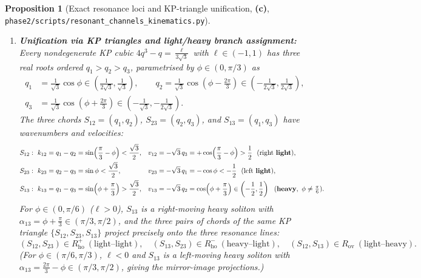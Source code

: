 \documentclass[11pt,a4paper]{article}
\newcommand{\Lc}{\textsf{\textbf{(c)}}\xspace}
\newcommand{\skin}{\texttt{phase2/\allowbreak scripts/\allowbreak resonant\_\allowbreak channels\_\allowbreak kinematics.py}}
\newtheorem{proposition}{Proposition}[section]
\theoremstyle{remark}
\begin{document}
\begin{proposition}[Exact resonance loci and KP-triangle unification, \Lc, \skin]
\begin{enumerate}
\item \textbf{Unification via KP triangles and light/heavy branch assignment:}
Every nondegenerate KP cubic $4q^3 - q = \frac{\ell}{3\sqrt{3}}$ with
$\ell \in (-1,1)$ has three real roots ordered $q_1 > q_2 > q_3$, parametrised
by $\phi \in (0,\pi/3)$ as
\begin{align}\label{eq:kp_triple_param}
  q_1 &= \frac{1}{\sqrt{3}}\cos\phi \in \left(\frac{1}{2\sqrt{3}},\frac{1}{\sqrt{3}}\right), \qquad
  q_2 = \frac{1}{\sqrt{3}}\cos\!\left(\phi-\frac{2\pi}{3}\right) \in \left(-\frac{1}{2\sqrt{3}},\frac{1}{2\sqrt{3}}\right), \nonumber\\
  q_3 &= \frac{1}{\sqrt{3}}\cos\!\left(\phi+\frac{2\pi}{3}\right) \in \left(-\frac{1}{\sqrt{3}},-\frac{1}{2\sqrt{3}}\right).
\end{align}
The three chords $S_{12}=(q_1,q_2)$, $S_{23}=(q_2,q_3)$, and $S_{13}=(q_1,q_3)$
have wavenumbers and velocities:
\begin{align}
  S_{12}&:\ k_{12} = q_1-q_2 = \sin\!\left(\frac{\pi}{3}-\phi\right) < \frac{\sqrt{3}}{2}, &
  v_{12} &= -\sqrt{3}\,q_3 = +\cos\!\left(\frac{\pi}{3}-\phi\right) > \frac{1}{2}
  \ \ (\text{right \textbf{light}}), \nonumber\\
  S_{23}&:\ k_{23} = q_2-q_3 = \sin\phi < \frac{\sqrt{3}}{2}, &
  v_{23} &= -\sqrt{3}\,q_1 = -\cos\phi < -\frac{1}{2}
  \ \ (\text{left \textbf{light}}), \label{eq:triple_chords}\\
  S_{13}&:\ k_{13} = q_1-q_3 = \sin\!\left(\phi+\frac{\pi}{3}\right) > \frac{\sqrt{3}}{2}, &
  v_{13} &= -\sqrt{3}\,q_2 = \cos\!\left(\phi+\frac{\pi}{3}\right) \in \left(-\frac{1}{2},\frac{1}{2}\right)
  \ \ (\textbf{heavy},\ \phi\ne\tfrac{\pi}{6}). \nonumber
\end{align}
For $\phi \in (0,\pi/6)$ ($\ell > 0$), $S_{13}$ is a right-moving heavy soliton
with $\alpha_{13} = \phi+\frac{\pi}{3} \in (\pi/3,\pi/2)$, and the three pairs
of chords of the same KP triangle $\{S_{12},S_{23},S_{13}\}$ project precisely
onto the three resonance lines:
\begin{equation}\label{eq:three_projections}
  (S_{12},S_{23}) \in R_{\mathrm{ho}}^+ \ (\text{light--light}), \quad
  (S_{13},S_{23}) \in R_{\mathrm{ho}}^- \ (\text{heavy--light}), \quad
  (S_{12},S_{13}) \in R_{\mathrm{ov}} \ (\text{light--heavy}).
\end{equation}
(For $\phi \in (\pi/6,\pi/3)$, $\ell < 0$ and $S_{13}$ is a left-moving heavy
soliton with $\alpha_{13} = \frac{2\pi}{3}-\phi \in (\pi/3,\pi/2)$, giving the
mirror-image projections.)
\end{enumerate}
\end{proposition}
\end{document}
